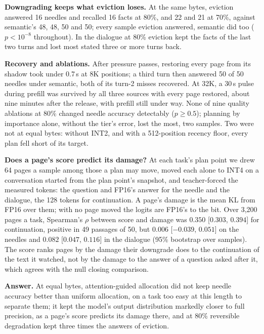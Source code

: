 \documentclass{article}
\begin{document}
\textbf{Downgrading keeps what eviction loses.} At the same bytes, eviction
answered 16 needles and recalled 16 facts at 80\%, and 22 and 21 at 70\%,
against semantic's 48, 48, 50 and 50; every sample eviction answered, semantic
did too ($p < 10^{-8}$ throughout). In the dialogue at 80\% eviction kept the
facts of the last two turns and lost most stated three or more turns back.

\textbf{Recovery and ablations.} After pressure passes, restoring every page
from its shadow took under 0.7\,s at 8K positions; a third turn then answered
50 of 50 needles under semantic, both of its turn-2 misses recovered. At 32K,
a 30\,s pulse during prefill was survived by all three sources with every page
restored, about nine minutes after the release, with prefill still under way.
None of nine quality ablations at 80\% changed needle accuracy detectably
($p \ge 0.5$); planning by importance alone, without the tier's error, lost
the most, two samples. Two were not at equal bytes: without INT2, and with a
512-position recency floor, every plan fell short of its target.

\textbf{Does a page's score predict its damage?} At each task's plan point
we drew 64 pages a sample among those a plan may move, moved each alone to
INT4 on a conversation started from the plan point's snapshot, and
teacher-forced the measured tokens: the question and FP16's answer for the
needle and the dialogue, the 128 tokens for continuation. A page's damage is
the mean KL from FP16 over them; with no page moved the logits are FP16's to the
bit. Over 3{,}200 pages a task, Spearman's $\rho$ between score and damage was
$0.350$ [$0.303$, $0.394$] for continuation, positive in 49 passages of 50, but
$0.006$ [$-0.039$, $0.051$] on the needles and $0.082$ [$0.047$, $0.116$] in the
dialogue (95\% bootstrap over samples). The score ranks pages by the damage
their downgrade does to the continuation of the text it watched, not by the
damage to the answer of a question asked after it, which agrees with the null
closing comparison.

\textbf{Answer.} At equal bytes, attention-guided allocation did not keep needle
accuracy better than uniform allocation, on a task too easy at this length to
separate them; it kept the model's output distribution markedly closer to full
precision, as a page's score predicts its damage there, and at 80\%
reversible degradation kept three times the answers of eviction.

\end{document}
